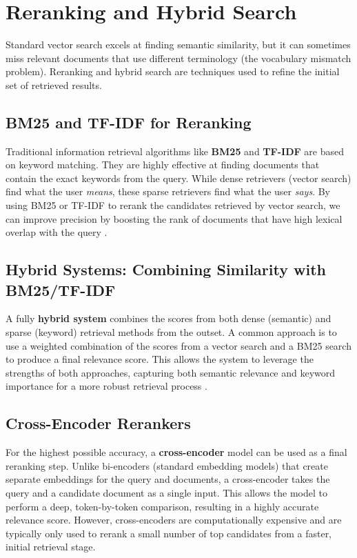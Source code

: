\section{Reranking and Hybrid Search}
Standard vector search excels at finding semantic similarity, but it can sometimes miss relevant documents that use different terminology (the vocabulary mismatch problem). Reranking and hybrid search are techniques used to refine the initial set of retrieved results.

\subsection{BM25 and TF-IDF for Reranking}
Traditional information retrieval algorithms like \textbf{BM25} and \textbf{TF-IDF} are based on keyword matching. They are highly effective at finding documents that contain the exact keywords from the query. While dense retrievers (vector search) find what the user \textit{means}, these sparse retrievers find what the user \textit{says}. By using BM25 or TF-IDF to rerank the candidates retrieved by vector search, we can improve precision by boosting the rank of documents that have high lexical overlap with the query \autocite{llm_ir_survey_2024}.

\subsection{Hybrid Systems: Combining Similarity with BM25/TF-IDF}
A fully \textbf{hybrid system} combines the scores from both dense (semantic) and sparse (keyword) retrieval methods from the outset. A common approach is to use a weighted combination of the scores from a vector search and a BM25 search to produce a final relevance score. This allows the system to leverage the strengths of both approaches, capturing both semantic relevance and keyword importance for a more robust retrieval process \autocite{reranking_survey_2025_djoudi}.

\subsection{Cross-Encoder Rerankers}
For the highest possible accuracy, a \textbf{cross-encoder} model can be used as a final reranking step. Unlike bi-encoders (standard embedding models) that create separate embeddings for the query and documents, a cross-encoder takes the query and a candidate document as a single input. This allows the model to perform a deep, token-by-token comparison, resulting in a highly accurate relevance score. However, cross-encoders are computationally expensive and are typically only used to rerank a small number of top candidates from a faster, initial retrieval stage.

